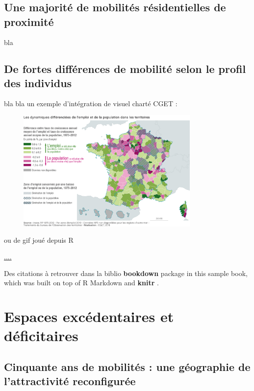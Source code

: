 \documentclass[]{book}
\begin{document}
\section{Une majorité de mobilités résidentielles de
proximité}\label{une-majorite-de-mobilites-residentielles-de-proximite}

bla

\section{De fortes différences de mobilité selon le profil des
individus}\label{de-fortes-differences-de-mobilite-selon-le-profil-des-individus}

bla bla un exemple d'intégration de visuel charté CGET :

\begin{figure}
\centering
\includegraphics[width=0.80000\textwidth]{./img/1A_Carte5_Diff_Tx_croissance_emploi_pop-01.jpg}
\caption{}
\end{figure}

ou de gif joué depuis R

\url{....}

Des citations à retrouver dans la biblio \textbf{bookdown} package
\citep{R-bookdown} in this sample book, which was built on top of R
Markdown and \textbf{knitr} \citep{xie2015}.

\chapter{Espaces excédentaires et
déficitaires}\label{espaces-excedentaires-et-deficitaires}

\section{Cinquante ans de mobilités : une géographie de l'attractivité
reconfigurée}\label{cinquante-ans-de-mobilites-une-geographie-de-lattractivite-reconfiguree}
\end{document}
